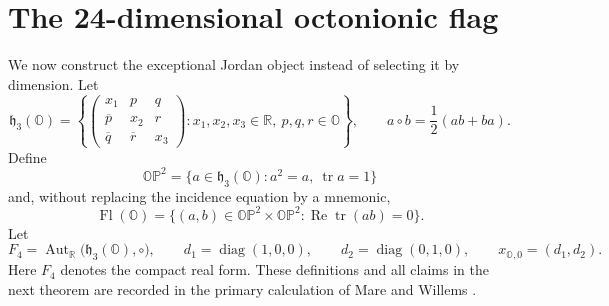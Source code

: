 \documentclass[11pt]{article}
\theoremstyle{definition}
\newcommand{\R}{\mathbb R}
\newcommand{\Oo}{\mathbb O}
\newcommand{\PP}{\mathbb P}
\newcommand{\tr}{\operatorname{tr}}
\newcommand{\diag}{\operatorname{diag}}
\begin{document}
\section{The 24-dimensional octonionic flag}
\label{sec:octonionic-flag}

We now construct the exceptional Jordan object instead of selecting it by
dimension.  Let
\[
 \mathfrak h_3(\Oo)=
 \left\{
 \begin{pmatrix}
 x_1&p&q\\ \overline p&x_2&r\\ \overline q&\overline r&x_3
 \end{pmatrix}:
 x_1,x_2,x_3\in\R,\ p,q,r\in\Oo
 \right\},
 \qquad
 a\circ b=\frac12(ab+ba).
\]
Define
\[
 \Oo\PP^2=\{a\in\mathfrak h_3(\Oo):a^2=a,\ \tr a=1\}
\]
and, without replacing the incidence equation by a mnemonic,
\begin{equation}
 \operatorname{Fl}(\Oo)=
 \{(a,b)\in\Oo\PP^2\times\Oo\PP^2:
                 \operatorname{Re}\tr(ab)=0\}.
 \label{eq:octonionic-flag-definition}
\end{equation}
Let
\[
 F_4=\operatorname{Aut}_{\R}\bigl(\mathfrak h_3(\Oo),\circ\bigr),\qquad
 d_1=\diag(1,0,0),\qquad d_2=\diag(0,1,0),\qquad
 x_{\Oo,0}=(d_1,d_2).
\]
Here \(F_4\) denotes the compact real form.  These definitions and all
claims in the next theorem are recorded in the primary calculation of
 Mare and Willems \cite[Definition~2.2, p.~488;
 Proposition~2.4, p.~489, and Proposition~2.7, p.~491, and the
 root-space discussion on pp.~491--492]{MareWillems2013}.
\end{document}
